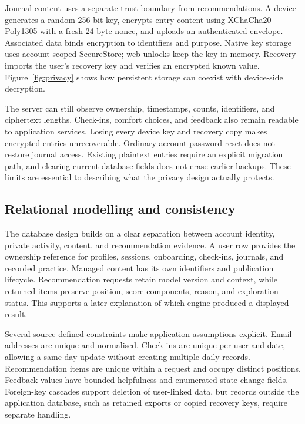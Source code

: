 Journal content uses a separate trust boundary from recommendations. A device generates a random 256-bit key, encrypts entry content using XChaCha20-Poly1305 with a fresh 24-byte nonce, and uploads an authenticated envelope. Associated data binds encryption to identifiers and purpose. Native key storage uses account-scoped SecureStore; web unlocks keep the key in memory. Recovery imports the user's recovery key and verifies an encrypted known value. Figure~\ref{fig:privacy} shows how persistent storage can coexist with device-side decryption.

The server can still observe ownership, timestamps, counts, identifiers, and ciphertext lengths. Check-ins, comfort choices, and feedback also remain readable to application services. Losing every device key and recovery copy makes encrypted entries unrecoverable. Ordinary account-password reset does not restore journal access. Existing plaintext entries require an explicit migration path, and clearing current database fields does not erase earlier backups. These limits are essential to describing what the privacy design actually protects.

\subsection{Relational modelling and consistency}

The database design builds on a clear separation between account identity, private activity, content, and recommendation evidence. A user row provides the ownership reference for profiles, sessions, onboarding, check-ins, journals, and recorded practice. Managed content has its own identifiers and publication lifecycle. Recommendation requests retain model version and context, while returned items preserve position, score components, reason, and exploration status. This supports a later explanation of which engine produced a displayed result.

Several source-defined constraints make application assumptions explicit. Email addresses are unique and normalised. Check-ins are unique per user and date, allowing a same-day update without creating multiple daily records. Recommendation items are unique within a request and occupy distinct positions. Feedback values have bounded helpfulness and enumerated state-change fields. Foreign-key cascades support deletion of user-linked data, but records outside the application database, such as retained exports or copied recovery keys, require separate handling.

